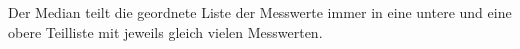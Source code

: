 
Der Median teilt die geordnete Liste der Messwerte immer in eine untere und eine obere Teilliste mit jeweils gleich vielen Messwerten.
